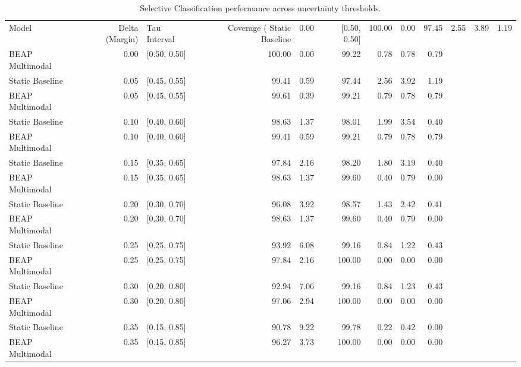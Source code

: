 \begin{table}
\caption{Selective Classification performance across uncertainty thresholds.}
\label{tab:abstention_tradeoff}
\begin{tabular}{lrlrrrrrr}
\toprule
Model & Delta (Margin) & Tau Interval & Coverage (%
\midrule
Static Baseline & 0.00 & [0.50, 0.50] & 100.00 & 0.00 & 97.45 & 2.55 & 3.89 & 1.19 \\
BEAP Multimodal & 0.00 & [0.50, 0.50] & 100.00 & 0.00 & 99.22 & 0.78 & 0.78 & 0.79 \\
Static Baseline & 0.05 & [0.45, 0.55] & 99.41 & 0.59 & 97.44 & 2.56 & 3.92 & 1.19 \\
BEAP Multimodal & 0.05 & [0.45, 0.55] & 99.61 & 0.39 & 99.21 & 0.79 & 0.78 & 0.79 \\
Static Baseline & 0.10 & [0.40, 0.60] & 98.63 & 1.37 & 98.01 & 1.99 & 3.54 & 0.40 \\
BEAP Multimodal & 0.10 & [0.40, 0.60] & 99.41 & 0.59 & 99.21 & 0.79 & 0.78 & 0.79 \\
Static Baseline & 0.15 & [0.35, 0.65] & 97.84 & 2.16 & 98.20 & 1.80 & 3.19 & 0.40 \\
BEAP Multimodal & 0.15 & [0.35, 0.65] & 98.63 & 1.37 & 99.60 & 0.40 & 0.79 & 0.00 \\
Static Baseline & 0.20 & [0.30, 0.70] & 96.08 & 3.92 & 98.57 & 1.43 & 2.42 & 0.41 \\
BEAP Multimodal & 0.20 & [0.30, 0.70] & 98.63 & 1.37 & 99.60 & 0.40 & 0.79 & 0.00 \\
Static Baseline & 0.25 & [0.25, 0.75] & 93.92 & 6.08 & 99.16 & 0.84 & 1.22 & 0.43 \\
BEAP Multimodal & 0.25 & [0.25, 0.75] & 97.84 & 2.16 & 100.00 & 0.00 & 0.00 & 0.00 \\
Static Baseline & 0.30 & [0.20, 0.80] & 92.94 & 7.06 & 99.16 & 0.84 & 1.23 & 0.43 \\
BEAP Multimodal & 0.30 & [0.20, 0.80] & 97.06 & 2.94 & 100.00 & 0.00 & 0.00 & 0.00 \\
Static Baseline & 0.35 & [0.15, 0.85] & 90.78 & 9.22 & 99.78 & 0.22 & 0.42 & 0.00 \\
BEAP Multimodal & 0.35 & [0.15, 0.85] & 96.27 & 3.73 & 100.00 & 0.00 & 0.00 & 0.00 \\
\bottomrule
\end{tabular}
\end{table}
